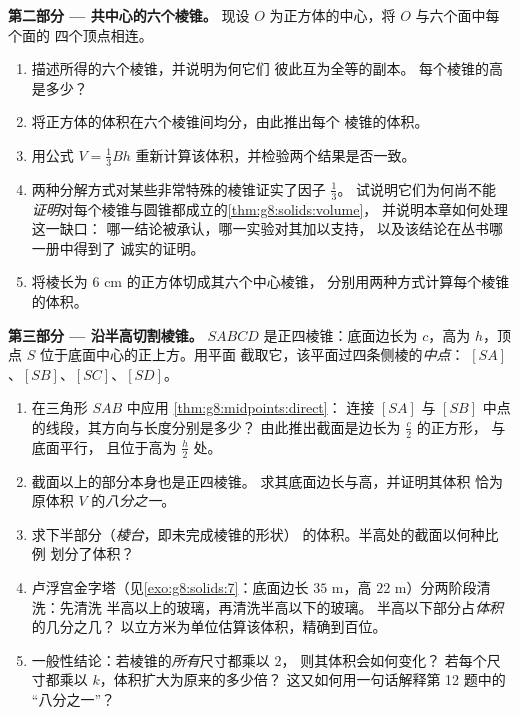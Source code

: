 \begin{problem}
\medskip
\noindent\textbf{第二部分 --- 共中心的六个棱锥。}
现设 $O$ 为正方体的中心，将 $O$ 与六个面中每个面的
四个顶点相连。
\begin{enumerate}[resume]
  \item 描述所得的六个棱锥，并说明为何它们
        彼此互为全等的副本。
        每个棱锥的高是多少？
  \item 将正方体的体积在六个棱锥间均分，由此推出每个
        棱锥的体积。
  \item 用公式
        $V = \frac13 B h$ 重新计算该体积，并检验两个结果是否一致。
  \item 两种分解方式对某些非常特殊的棱锥证实了因子 $\frac13$。
        试说明它们为何尚不能
        \emph{证明}对每个棱锥与圆锥都成立的\cref{thm:g8:solids:volume}，
        并说明本章如何处理这一缺口：
        哪一结论被承认，哪一实验对其加以支持，
        以及该结论在丛书哪一册中得到了
        诚实的证明。
  \item 将棱长为 $6$ cm 的正方体切成其六个中心棱锥，
        分别用两种方式计算每个棱锥的体积。
\end{enumerate}

\medskip
\noindent\textbf{第三部分 --- 沿半高切割棱锥。}
$SABCD$ 是正四棱锥：底面边长为 $c$，高为
$h$，顶点 $S$ 位于底面中心的正上方。用平面
截取它，该平面过四条侧棱的\emph{中点}：
$[SA]$、$[SB]$、$[SC]$、$[SD]$。
\begin{enumerate}[resume]
  \item 在三角形 $SAB$ 中应用
        \cref{thm:g8:midpoints:direct}：
        连接 $[SA]$ 与 $[SB]$ 中点的线段，其方向与长度分别是多少？
        由此推出截面是边长为 $\frac{c}{2}$ 的正方形，
        与底面平行，
        且位于高为 $\frac{h}{2}$ 处。
  \item 截面以上的部分本身也是正四棱锥。
        求其底面边长与高，并证明其体积
        恰为原体积 $V$ 的\emph{八分之一}。
  \item 求下半部分（\emph{棱台}，即未完成棱锥的形状）
        的体积。半高处的截面以何种比例
        划分了体积？
  \item 卢浮宫金字塔（见\cref{exo:g8:solids:7}：底面边长
        $35$ m，高 $22$ m）分两阶段清洗：先清洗
        半高以上的玻璃，再清洗半高以下的玻璃。
        半高以下部分占\emph{体积}的几分之几？
        以立方米为单位估算该体积，精确到百位。
  \item 一般性结论：若棱锥的\emph{所有}尺寸都乘以 $2$，
        则其体积会如何变化？
        若每个尺寸都乘以 $k$，体积扩大为原来的多少倍？
        这又如何用一句话解释第 12 题中的
        “八分之一”？
\end{enumerate}
\end{problem}

